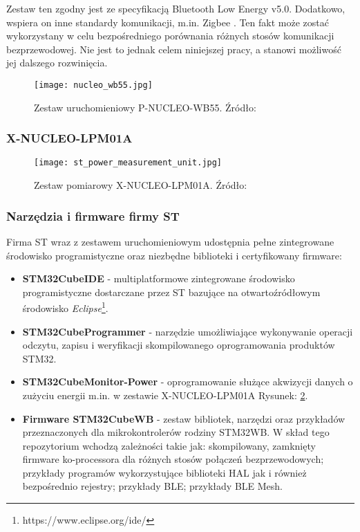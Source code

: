 Zestaw ten zgodny jest ze specyfikacją Bluetooth Low Energy v5.0. Dodatkowo, wspiera
on inne standardy komunikacji, m.in. Zigbee \cite{noauthor_stm32wb_2022}.
Ten fakt może zostać wykorzystany w celu bezpośredniego porównania różnych stosów komunikacji bezprzewodowej.
Nie jest to jednak celem niniejszej pracy, a stanowi możliwość jej dalszego 
rozwinięcia.


\begin{figure}[!htb]
	\centering \texttt{[image: nucleo\_wb55.jpg]}
	\caption{Zestaw uruchomieniowy P-NUCLEO-WB55. Źródło: \cite{noauthor_p-nucleo-wb55_nodate}}
	\label{rys:nucleo_wb55}
\end{figure}


\subsubsection{X-NUCLEO-LPM01A}
\begin{figure}[!htb]
	\centering \texttt{[image: st\_power\_measurement\_unit.jpg]}
	\caption{Zestaw pomiarowy X-NUCLEO-LPM01A. Źródło: \cite{noauthor_x-nucleo-lpm01a_nodate}}
	\label{rys:nucleo_lpm01a}
\end{figure}

\subsubsection{Narzędzia i firmware firmy ST}
Firma ST wraz z zestawem uruchomieniowym udostępnia pełne zintegrowane środowisko
programistyczne oraz niezbędne biblioteki i certyfikowany firmware:

\begin{itemize}
\item \textbf{STM32CubeIDE} \cite{noauthor_stm32cubeide_2022} - multiplatformowe zintegrowane środowisko programistyczne
dostarczane przez ST bazujące na otwartoźródłowym środowisko \textit{Eclipse}\footnote{https://www.eclipse.org/ide/}.
\item \textbf{STM32CubeProgrammer} \cite{noauthor_stm32cubeprog_2022} - narzędzie umożliwiające wykonywanie operacji
odczytu, zapisu i weryfikacji skompilowanego oprogramowania produktów STM32. 
\item \textbf{STM32CubeMonitor-Power} \cite{noauthor_stm32cubemonpwr_2022} - oprogramowanie służące akwizycji danych
o zużyciu energii m.in. w zestawie X-NUCLEO-LPM01A Rysunek: \ref{rys:nucleo_lpm01a}.
\item \textbf{Firmware STM32CubeWB} \cite{noauthor_stm32cubewb_2022} - zestaw bibliotek, narzędzi oraz przykładów
przeznaczonych dla mikrokontrolerów rodziny STM32WB. W skład tego repozytorium wchodzą zależności takie jak:
skompilowany, zamknięty firmware ko-processora dla różnych stosów połączeń bezprzewodowych; przykłady programów
wykorzystujące biblioteki HAL jak i również bezpośrednio rejestry; przykłady BLE; przykłady BLE Mesh.
\end{itemize}
